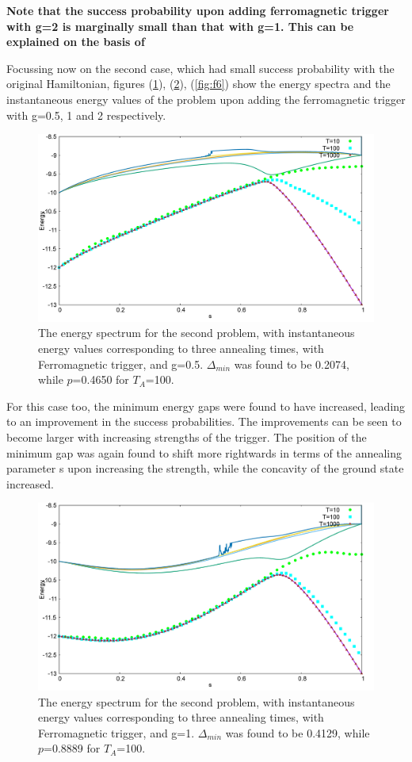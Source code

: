 \documentclass[../main.tex]{subfiles}
\begin{document}
\textbf{Note that the success probability upon adding ferromagnetic trigger with g=2 is marginally small than that with g=1. This can be explained on the basis of}


Focussing now on the second case, which had small success probability with the original Hamiltonian, figures (\ref{fig:f4}), (\ref{fig:f5}), (\ref{fig:f6}) show the energy spectra and the instantaneous energy values of the problem upon adding the ferromagnetic trigger with g=0.5, 1 and 2 respectively. 
\begin{figure}[H]
\centering 
\includegraphics[scale=0.3]{950_s12_F_g0.png}
\caption{The energy spectrum for the second problem, with instantaneous energy values corresponding to three annealing times, with Ferromagnetic trigger, and g=0.5. $\Delta_{min}$ was found to be 0.2074, while $p$=0.4650 for $T_A$=100.}
\label{fig:f4}
\end{figure}
For this case too, the minimum energy gaps were found to have increased, leading to an improvement in the success probabilities. The improvements can be seen to become larger with increasing strengths of the trigger. The position of the minimum gap was again found to shift more rightwards in terms of the annealing parameter s upon increasing the strength, while the concavity of the ground state increased. \\
\begin{figure}[H]
\centering 
\includegraphics[scale=0.3]{950_s12_F_g1.png}
\caption{The energy spectrum for the second problem, with instantaneous energy values corresponding to three annealing times, with Ferromagnetic trigger, and g=1. $\Delta_{min}$ was found to be 0.4129, while $p$=0.8889 for $T_A$=100.}
\label{fig:f5}
\end{figure}
\end{document}
